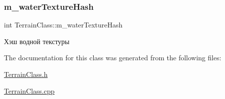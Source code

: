 \subsubsection{\texorpdfstring{m\+\_\+water\+Texture\+Hash}{m\_waterTextureHash}}
{\footnotesize\ttfamily int Terrain\+Class\+::m\+\_\+water\+Texture\+Hash\hspace{0.3cm}{\ttfamily [private]}}



Хэш водной текстуры 



The documentation for this class was generated from the following files\+:\begin{DoxyCompactItemize}
\item 
\hyperlink{_terrain_class_8h}{Terrain\+Class.\+h}\item 
\hyperlink{_terrain_class_8cpp}{Terrain\+Class.\+cpp}\end{DoxyCompactItemize}
